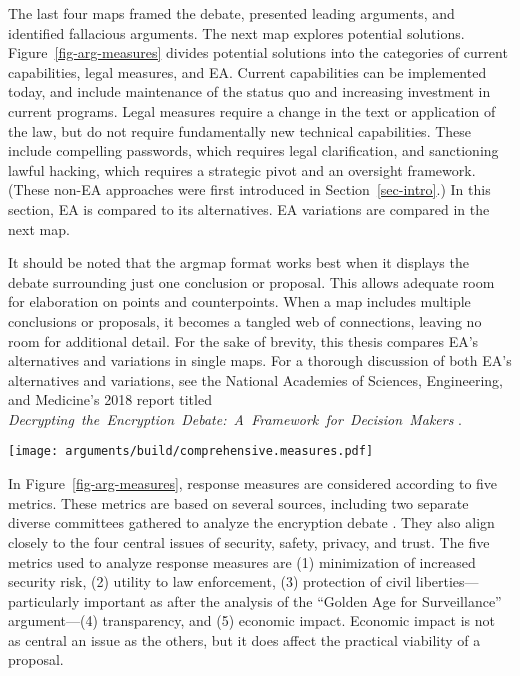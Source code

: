 \documentclass[conference]{IEEEtran}
\def\ii#1{\mbox{\textit{#1}}}
\newcommand{\myfig}[1]{Figure~\ref{#1}}
\newcommand{\mysec}[1]{Section~\ref{#1}}
\begin{document}
The last four maps framed the debate, presented leading arguments, and identified fallacious arguments. The next map
explores potential solutions. \myfig{fig-arg-measures} divides potential solutions into the categories of current
capabilities, legal measures, and \ac{EA}. Current capabilities can be implemented today, and include maintenance of the
status quo and increasing investment in current programs. Legal measures require a change in the text or application of
the law, but do not require fundamentally new technical capabilities. These include compelling passwords, which requires
legal clarification, and sanctioning lawful hacking, which requires a strategic pivot and an oversight framework. (These
non-\ac{EA} approaches were first introduced in \mysec{sec-intro}.) In this section, \ac{EA} is compared to its
alternatives. \ac{EA} variations are compared in the next map.


It should be noted that the \ac{argmap} format works best when it displays the debate surrounding just one conclusion or
proposal. This allows adequate room for elaboration on points and counterpoints. When a map includes multiple
conclusions or proposals, it becomes a tangled web of connections, leaving no room for additional detail. For the sake
of brevity, this thesis compares \ac{EA}'s alternatives and variations in single maps. For a thorough discussion of both
\ac{EA}'s alternatives and variations, see the National Academies of Sciences, Engineering, and Medicine's 2018 report
titled \ii{Decrypting the Encryption Debate: A Framework for Decision Makers} \cite{committee_decrypting_2018}.

\begin{sidewaysfigure*}
  \centering
  \texttt{[image: arguments/build/comprehensive.measures.pdf]}
  \caption{EA and its Alternatives}
  \label{fig-arg-measures}
\end{sidewaysfigure*}

In \myfig{fig-arg-measures}, response measures are considered according to five metrics. These metrics are based on
several sources, including two separate diverse committees gathered to analyze the encryption debate
\cite{committee_decrypting_2018} \cite{group_2019} \cite{varia_2018}. They also align closely to the four central issues
of security, safety, privacy, and trust. The five metrics used to analyze response measures are (1) minimization of
increased security risk, (2) utility to law enforcement, (3) protection of civil liberties---particularly important as
after the analysis of the ``Golden Age for Surveillance'' argument---(4) transparency, and (5) economic impact. Economic
impact is not as central an issue as the others, but it does affect the practical viability of a proposal.
\end{document}

